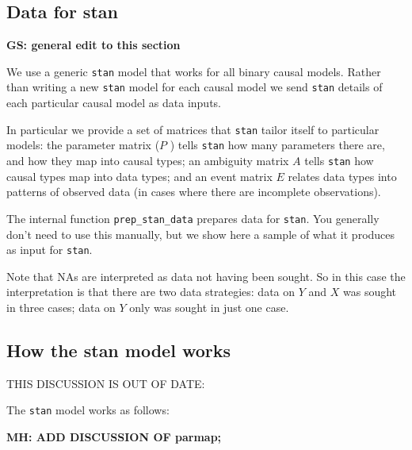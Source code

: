 \documentclass[
  11pt,
  article]{jss}
\begin{document}
\hypertarget{data-for-stan}{%
\subsection{Data for stan}\label{data-for-stan}}

\textbf{GS: general edit to this section}

We use a generic \texttt{stan} model that works for all binary causal
models. Rather than writing a new \texttt{stan} model for each causal
model we send \texttt{stan} details of each particular causal model as
data inputs.

In particular we provide a set of matrices that \texttt{stan} tailor
itself to particular models: the parameter matrix (\(P\) ) tells
\texttt{stan} how many parameters there are, and how they map into
causal types; an ambiguity matrix \(A\) tells \texttt{stan} how causal
types map into data types; and an event matrix \(E\) relates data types
into patterns of observed data (in cases where there are incomplete
observations).

The internal function \texttt{prep\_stan\_data} prepares data for
\texttt{stan}. You generally don't need to use this manually, but we
show here a sample of what it produces as input for \texttt{stan}.

Note that NAs are interpreted as data not having been sought. So in this
case the interpretation is that there are two data strategies: data on
\(Y\) and \(X\) was sought in three cases; data on \(Y\) only was sought
in just one case.

\hypertarget{how-the-stan-model-works}{%
\subsection{How the stan model works}\label{how-the-stan-model-works}}

THIS DISCUSSION IS OUT OF DATE:

The \texttt{stan} model works as follows:

\textbf{MH: ADD DISCUSSION OF parmap;}
\end{document}
